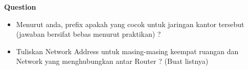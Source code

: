 \documentclass{article}
\begin{document}
	\newpage

	\begin{center}
        \textbf{Question}
    \end{center}
	
    \begin{itemize}
    	\item Menurut anda, prefix apakah yang cocok untuk jaringan kantor tersebut (jawaban bersifat bebas menurut praktikan) ?
    	\item Tuliskan Network Address untuk masing-masing keempat ruangan dan Network yang menghubungkan antar Router ? (Buat listnya)
    \end{itemize}
\end{document}
